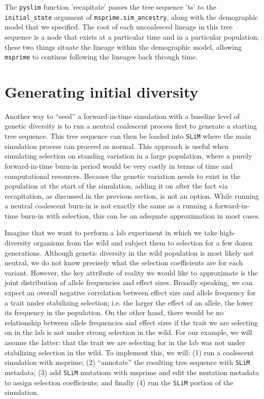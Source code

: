 \documentclass[12pt]{article}
\newcommand{\msprime}[0]{\texttt{msprime}\xspace}
\newcommand{\slim}[0]{\texttt{SLiM}\xspace}
\newcommand{\pyslim}[0]{\texttt{pyslim}\xspace}
\begin{document}
The \pyslim function 'recapitate' passes the tree sequence 'ts' to the
\texttt{initial\_state} argument of \texttt{msprime.sim\_ancestry},
along with the demographic model that we specified.
The root of each uncoalesced lineage in this tree sequence is a node
that exists at a particular time and in a particular population;
these two things situate the lineage within the demographic model,
allowing \msprime to continue following the lineages back through time.

\section{Generating initial diversity} %

Another way to ``seed'' a forward-in-time simulation with a baseline level of genetic diversity
is to run a neutral coalescent process first to generate a starting tree sequence. This tree sequence
can then be loaded into \slim where the main simulation process can proceed as normal. This
approach is useful when simulating selection on standing variation in a large population, where
a purely forward-in-time burn-in period would be very costly in terms of time and computational resources.
Because the genetic variation needs to exist in the population at the start of the simulation, adding
it on after the fact via recapitation, as discussed in the previous section, is not an option. While running
a neutral coalescent burn-in is not exactly the same as a running a forward-in-time burn-in with selection,
this can be an adequate approximation in most cases. %

Imagine that we want to perform a lab experiment in which we take high-diversity
organisms from the wild and subject them to selection for a few dozen generations.
Although genetic diversity in the wild population is most likely not neutral,
we do not know precisely what the selection coefficients are for each variant.
However, the key attribute of reality we would like to approximate is the joint distribution of
allele frequencies and effect sizes. Broadly speaking, we can expect an overall negative correlation
between effect size and allele frequency for a trait under stabilizing selection; i.e. the larger
the effect of an allele, the lower its frequency in the population.
On the other hand, there would be no relationship between allele frequencies and effect sizes
if the trait we are selecting on in the lab is not under strong selection in the wild.
For our example, we will assume the latter: that the trait we are selecting for in the lab was
not under stabilizing selection in the wild. To implement this, we will:
(1) run a coalescent simulation with msprime;
(2) ``annotate'' the resulting tree sequence with \slim metadata;
(3) add \slim mutations with msprime
        and edit the mutation metadata to assign selection coefficients; and finally
(4) run the \slim portion of the simulation.
\end{document}
